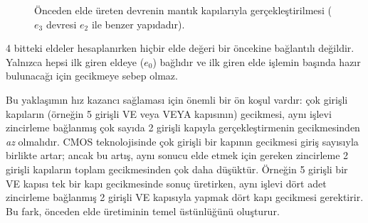 \begin{figure}[htbp]
\caption[Önceden elde üreten devre]{Önceden elde üreten devrenin mantık kapılarıyla gerçekleştirilmesi ($e_3$ devresi $e_2$ ile benzer yapıdadır).}
\label{fig:onceden-elde}
\end{figure}

4 bitteki eldeler hesaplanırken hiçbir elde değeri bir öncekine bağlantılı değildir. Yalnızca hepsi ilk giren eldeye ($e_0$) bağlıdır ve ilk giren elde işlemin başında hazır bulunacağı için gecikmeye sebep olmaz.

Bu yaklaşımın hız kazancı sağlaması için önemli bir ön koşul vardır: çok girişli kapıların (örneğin 5 girişli VE veya VEYA kapısının) gecikmesi, aynı işlevi zincirleme bağlanmış çok sayıda 2 girişli kapıyla gerçekleştirmenin gecikmesinden \emph{az} olmalıdır. CMOS teknolojisinde çok girişli bir kapının gecikmesi giriş sayısıyla birlikte artar; ancak bu artış, aynı sonucu elde etmek için gereken zincirleme 2 girişli kapıların toplam gecikmesinden çok daha düşüktür. Örneğin 5 girişli bir VE kapısı tek bir kapı gecikmesinde sonuç üretirken, aynı işlevi dört adet zincirleme bağlanmış 2 girişli VE kapısıyla yapmak dört kapı gecikmesi gerektirir. Bu fark, önceden elde üretiminin temel üstünlüğünü oluşturur.

